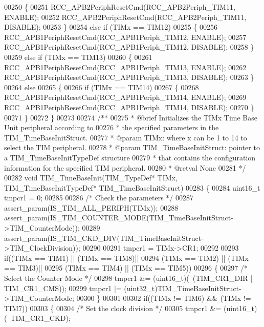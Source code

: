 \begin{DoxyCode}
00250   \{
00251     RCC_APB2PeriphResetCmd(RCC_APB2Periph_TIM11, ENABLE);
00252     RCC_APB2PeriphResetCmd(RCC_APB2Periph_TIM11, DISABLE);
00253   \}
00254   \textcolor{keywordflow}{else} \textcolor{keywordflow}{if} (TIMx == TIM12)
00255   \{
00256     RCC_APB1PeriphResetCmd(RCC_APB1Periph_TIM12, ENABLE);
00257     RCC_APB1PeriphResetCmd(RCC_APB1Periph_TIM12, DISABLE);
00258   \}
00259   \textcolor{keywordflow}{else} \textcolor{keywordflow}{if} (TIMx == TIM13)
00260   \{
00261     RCC_APB1PeriphResetCmd(RCC_APB1Periph_TIM13, ENABLE);
00262     RCC_APB1PeriphResetCmd(RCC_APB1Periph_TIM13, DISABLE);
00263   \}
00264   \textcolor{keywordflow}{else}
00265   \{
00266     \textcolor{keywordflow}{if} (TIMx == TIM14)
00267     \{
00268       RCC_APB1PeriphResetCmd(RCC_APB1Periph_TIM14, ENABLE);
00269       RCC_APB1PeriphResetCmd(RCC_APB1Periph_TIM14, DISABLE);
00270     \}
00271   \}
00272 \}
00273 
00274 \textcolor{comment}{/**}
00275 \textcolor{comment}{  * @brief  Initializes the TIMx Time Base Unit peripheral according to }
00276 \textcolor{comment}{  *         the specified parameters in the TIM\_TimeBaseInitStruct.}
00277 \textcolor{comment}{  * @param  TIMx: where x can be  1 to 14 to select the TIM peripheral.}
00278 \textcolor{comment}{  * @param  TIM\_TimeBaseInitStruct: pointer to a TIM\_TimeBaseInitTypeDef structure}
00279 \textcolor{comment}{  *         that contains the configuration information for the specified TIM peripheral.}
00280 \textcolor{comment}{  * @retval None}
00281 \textcolor{comment}{  */}
00282 \textcolor{keywordtype}{void} TIM_TimeBaseInit(TIM\_TypeDef* TIMx, TIM\_TimeBaseInitTypeDef* TIM\_TimeBaseInitStruct)
00283 \{
00284   uint16\_t tmpcr1 = 0;
00285 
00286   \textcolor{comment}{/* Check the parameters */}
00287   assert_param(IS\_TIM\_ALL\_PERIPH(TIMx));
00288   assert_param(IS\_TIM\_COUNTER\_MODE(TIM\_TimeBaseInitStruct->TIM\_CounterMode));
00289   assert_param(IS\_TIM\_CKD\_DIV(TIM\_TimeBaseInitStruct->TIM\_ClockDivision));
00290 
00291   tmpcr1 = TIMx->CR1;
00292 
00293   \textcolor{keywordflow}{if}((TIMx == TIM1) || (TIMx == TIM8)||
00294      (TIMx == TIM2) || (TIMx == TIM3)||
00295      (TIMx == TIM4) || (TIMx == TIM5))
00296   \{
00297     \textcolor{comment}{/* Select the Counter Mode */}
00298     tmpcr1 &= (uint16\_t)(~(TIM_CR1_DIR | TIM_CR1_CMS));
00299     tmpcr1 |= (uint32\_t)TIM\_TimeBaseInitStruct->TIM_CounterMode;
00300   \}
00301 
00302   \textcolor{keywordflow}{if}((TIMx != TIM6) && (TIMx != TIM7))
00303   \{
00304     \textcolor{comment}{/* Set the clock division */}
00305     tmpcr1 &=  (uint16\_t)(~TIM_CR1_CKD);

\end{DoxyCode}
